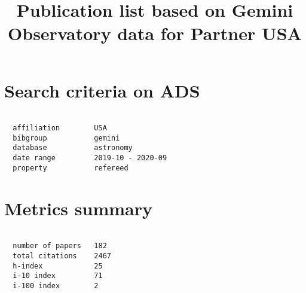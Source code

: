 \documentclass[twocolumn,linenumbers]{aastex631}
\begin{document}
\title{Publication list based on Gemini Observatory data for Partner USA}

\section*{Search criteria on ADS}

\begin{verbatim}

  affiliation        USA
  bibgroup           gemini
  database           astronomy
  date range         2019-10 - 2020-09
  property           refereed

\end{verbatim}

\vspace{4.0cm}

\section*{Metrics summary}

\begin{verbatim}

  number of papers   182
  total citations    2467
  h-index            25
  i-10 index         71
  i-100 index        2

\end{verbatim}

\vspace{4cm}

\nocite{*}


\end{document}
